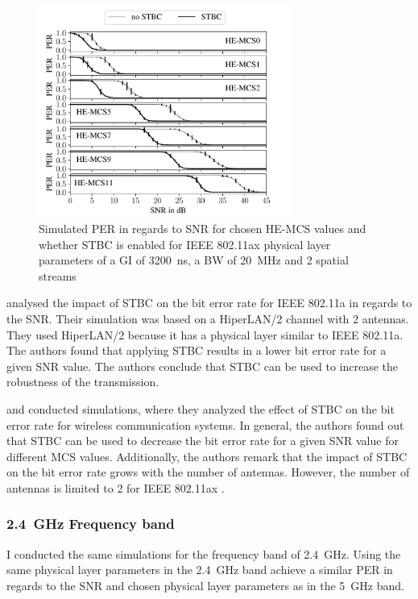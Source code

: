 \begin{figure}%
   \centering
   \includegraphics[width=0.74\textwidth]{figures/STBC_PER_to_SNR.pdf}
   \caption{Simulated \ac{PER} in regards to \ac{SNR} for chosen \ac{HE}-\ac{MCS} values and whether \acf{STBC} is enabled for IEEE 802.11ax physical layer parameters of a \ac{GI} of \SI{3200}{\nano\second}, a \ac{BW} of \SI{20}{\mega\hertz} and 2 spatial streams}%
   \label{fig:PER_SNR_STBC}%
\end{figure}
\textcite{stamoulis_impact_2003} analysed the impact of \ac{STBC} on the bit error rate for IEEE 802.11a in regards to the \ac{SNR}. Their simulation was based
on a HiperLAN/2 channel with \num{2} antennas. They used HiperLAN/2 because it has a physical layer similar to IEEE 802.11a.
The authors found that applying \ac{STBC} results in a lower bit error rate for a given \ac{SNR} value. The authors conclude that \ac{STBC} can be used to increase the
robustness of the transmission.

\textcite{santumon_space-time_2012} and \textcite{tarokh_space-time_1999} conducted simulations, where they analyzed the effect of \ac{STBC} on the bit error rate for
wireless communication systems. In general, the authors found out that \ac{STBC} can be used to decrease the bit error rate for a given \ac{SNR} value for different
\ac{MCS} values. Additionally, the authors remark that the impact of \ac{STBC} on the bit error rate grows with the number of antennas.
However, the number of antennas is limited to \num{2} for IEEE 802.11ax \cite{ieee_standard_2021ax}.

\subsubsection*{\SI{2.4}{\giga\hertz} Frequency band}
I conducted the same simulations for the frequency band of \SI{2.4}{\giga\hertz}. Using the same physical layer parameters in
the \SI{2.4}{\giga\hertz} band achieve a similar \ac{PER} in regards to the \ac{SNR} and chosen physical layer parameters
as in the \SI{5}{\giga\hertz} band.

